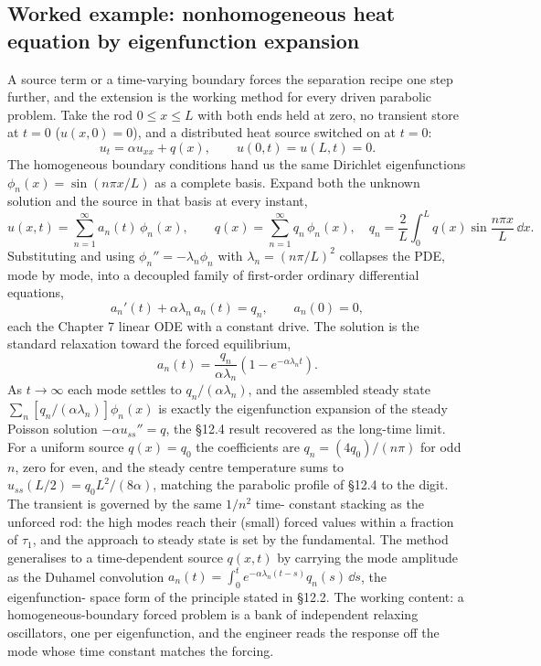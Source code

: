\subsection{Worked example: nonhomogeneous heat equation by eigenfunction expansion}

A source term or a time-varying boundary forces the separation
recipe one step further, and the extension is the working method
for every driven parabolic problem. Take the rod $0 \leq x \leq L$
with both ends held at zero, no transient store at $t = 0$
($u(x,0) = 0$), and a distributed heat source switched on at
$t = 0$:
\[
u_{t} = \alpha u_{xx} + q(x), \qquad u(0, t) = u(L, t) = 0.
\]
The homogeneous boundary conditions hand us the same Dirichlet
eigenfunctions $\phi_{n}(x) = \sin(n\pi x/L)$ as a complete basis.
Expand both the unknown solution and the source in that basis at
every instant,
\[
u(x, t) = \sum_{n=1}^{\infty} a_{n}(t)\,\phi_{n}(x), \qquad
q(x) = \sum_{n=1}^{\infty} q_{n}\,\phi_{n}(x),
\quad q_{n} = \frac{2}{L}\int_{0}^{L} q(x)\sin\frac{n\pi x}{L}\,\dd x.
\]
Substituting and using $\phi_{n}'' = -\lambda_{n}\phi_{n}$ with
$\lambda_{n} = (n\pi/L)^{2}$ collapses the PDE, mode by mode, into
a decoupled family of first-order ordinary differential equations,
\[
a_{n}'(t) + \alpha\lambda_{n}\,a_{n}(t) = q_{n},
\qquad a_{n}(0) = 0,
\]
each the Chapter 7 linear ODE with a constant drive. The solution
is the standard relaxation toward the forced equilibrium,
\[
a_{n}(t) = \frac{q_{n}}{\alpha\lambda_{n}}
\left(1 - e^{-\alpha\lambda_{n} t}\right).
\]
As $t \to \infty$ each mode settles to $q_{n}/(\alpha\lambda_{n})$,
and the assembled steady state $\sum_{n} [q_{n}/(\alpha\lambda_{n})]
\phi_{n}(x)$ is exactly the eigenfunction expansion of the
steady Poisson solution $-\alpha u_{ss}'' = q$, the §12.4 result
recovered as the long-time limit. For a uniform source $q(x) = q_{0}$
the coefficients are $q_{n} = (4q_{0})/(n\pi)$ for odd $n$, zero for
even, and the steady centre temperature sums to $u_{ss}(L/2) =
q_{0}L^{2}/(8\alpha)$, matching the parabolic profile of §12.4 to
the digit. The transient is governed by the same $1/n^{2}$ time-
constant stacking as the unforced rod: the high modes reach their
(small) forced values within a fraction of $\tau_{1}$, and the
approach to steady state is set by the fundamental. The method
generalises to a time-dependent source $q(x, t)$ by carrying the
mode amplitude as the Duhamel convolution $a_{n}(t) = \int_{0}^{t}
e^{-\alpha\lambda_{n}(t-s)} q_{n}(s)\,\dd s$, the eigenfunction-
space form of the principle stated in §12.2. The working content:
a homogeneous-boundary forced problem is a bank of independent
relaxing oscillators, one per eigenfunction, and the engineer reads
the response off the mode whose time constant matches the forcing.

